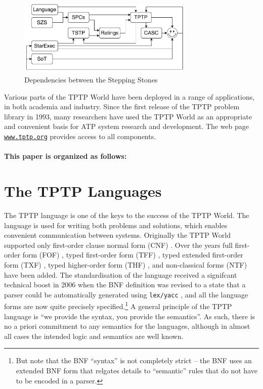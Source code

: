 \documentclass{easychair}
\begin{document}
\begin{figure}[htbp]
\centering
\includegraphics[width=0.75\textwidth]{Dependencies.pdf}
\caption{Dependencies between the Stepping Stones}
\label{Dependencies}
\end{figure}

Various parts of the TPTP World have been deployed in a range of applications, in both academia 
and industry.
Since the first release of the TPTP problem library in 1993, many researchers have used the 
TPTP World as an appropriate and convenient basis for ATP system research and development. 
The web page \href{http://www.tptp.org}{{\tt www.tptp.org}} provides access to all components.

\paragraph{This paper is organized as follows:}

\section{The TPTP Languages}
\label{Languages}

The TPTP language \cite{Sut23-IGPL} is one of the keys to the success of the TPTP World.
The language is used for writing both problems and solutions,
which enables convenient communication between systems. 
Originally the TPTP World supported only first-order clause normal form (CNF)
\cite{SS98-JAR}.
Over the years full first-order form (FOF)
\cite{Sut09}, 
typed first-order form (TFF)
\cite{SS+12,BP13-TFF1}, 
typed extended first-order form (TXF)
\cite{SK18}, 
typed higher-order form (THF)
\cite{SB10,KSR16}, 
and non-classical forms (NTF) \cite{SF+22} have been added.
The standardisation of the language received a signifcant technical boost in 2006 when the BNF
definition was revised to a state that a parser could be automatically generated using
{\tt lex/yacc} \cite{VS06}, and all the language forms are now quite precisely 
specified.\footnote{%
But note that the BNF ``syntax'' is not completely strict -- the BNF uses an extended BNF form
that relgates details to ``semantic'' rules that do not have to be encoded in a parser.}
A general principle of the TPTP language is ``we provide the syntax, you provide the semantics''.
As such, there is no a priori commitment to any semantics for the languages, although in almost 
all cases the intended logic and semantics are well known.
\end{document}
